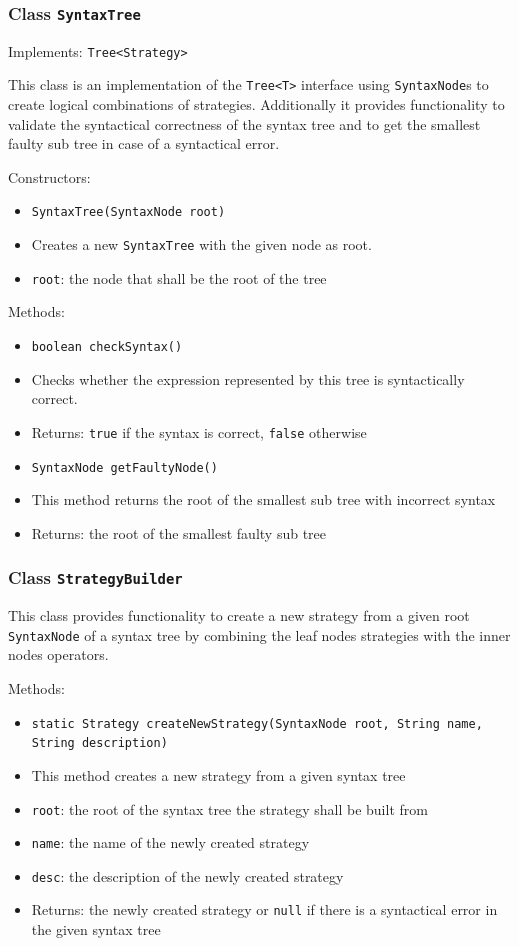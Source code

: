 \documentclass[parskip=full,11pt]{scrartcl}
\begin{document}
\subsubsection{Class \texttt{SyntaxTree}}
Implements: \texttt{Tree<Strategy>}

This class is an implementation of the \texttt{Tree<T>} interface using \texttt{SyntaxNode}s to create logical combinations of strategies. Additionally it provides functionality to validate the syntactical correctness of the syntax tree and to get the smallest faulty sub tree in case of a syntactical error.

Constructors:
\begin{itemize}\itemsep -10pt
	\item \texttt{SyntaxTree(SyntaxNode root)}
	\item[] Creates a new \texttt{SyntaxTree} with the given node as root.
	\item[] \texttt{root}: the node that shall be the root of the tree
\end{itemize}

Methods:
\begin{itemize} \itemsep -10pt
	\item \texttt{boolean checkSyntax()}
	\item[] Checks whether the expression represented by this tree is syntactically correct.
	\item[] Returns: \texttt{true} if the syntax is correct, \texttt{false} otherwise

	\item \texttt{SyntaxNode getFaultyNode()}
	\item[] This method returns the root of the smallest sub tree with incorrect syntax
	\item[] Returns: the root of the smallest faulty sub tree
\end{itemize}

\subsubsection{Class \texttt{StrategyBuilder}}

This class provides functionality to create a new strategy from a given root \texttt{SyntaxNode} of a syntax tree by combining the leaf nodes strategies with the inner nodes operators.

Methods:
\begin{itemize} \itemsep -10pt
	\item \texttt{static Strategy createNewStrategy(SyntaxNode root, String name, String description)}
	\item[] This method creates a new strategy from a given syntax tree
	\item[] \texttt{root}: the root of the syntax tree the strategy shall be built from
	\item[] \texttt{name}: the name of the newly created strategy
	\item[] \texttt{desc}: the description of the newly created strategy
	\item[] Returns: the newly created strategy or \texttt{null} if there is a syntactical error in the given syntax tree
\end{itemize}
\end{document}
